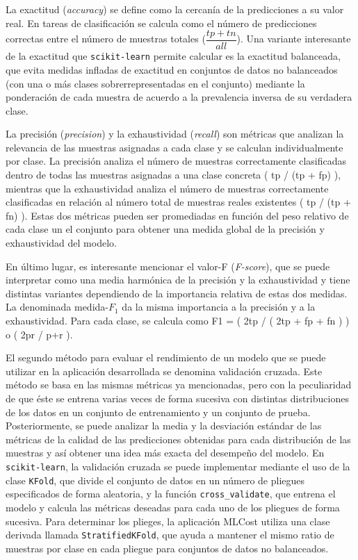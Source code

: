 La exactitud (\emph{accuracy}) se define como la cercanía de la predicciones a su valor real. En tareas de clasificación se calcula como el número de predicciones correctas entre el número de muestras totales ($\dfrac{tp+tn}{all}$). Una variante interesante de la exactitud que \texttt{scikit-learn} permite calcular es la exactitud balanceada, que evita medidas infladas de exactitud en conjuntos de datos no balanceados (con una o más clases sobrerrepresentadas en el conjunto) mediante la ponderación de cada muestra de acuerdo a la prevalencia inversa de su verdadera clase.

La precisión (\emph{precision}) y la exhaustividad (\emph{recall}) son métricas que analizan la relevancia de las muestras asignadas a cada clase y se calculan individualmente por clase. La precisión analiza el número de muestras correctamente clasificadas dentro de todas las muestras asignadas a una clase concreta ( tp / (tp + fp) ), mientras que la exhaustividad analiza el número de muestras correctamente clasificadas en relación al número total de muestras reales existentes ( tp / (tp + fn) ). Estas dos métricas pueden ser promediadas en función del peso relativo de cada clase un el conjunto para obtener una medida global de la precisión y exhaustividad del modelo.

En último lugar, es interesante mencionar el valor-F (\emph{F-score}), que se puede interpretar como una media harmónica de la precisión y la exhaustividad y tiene distintas variantes dependiendo de la importancia relativa de estas dos medidas. La denominada medida-$F_1$ da la misma importancia a la precisión y a la exhaustividad. Para cada clase, se calcula como F1 = ( 2tp / ( 2tp + fp + fn ) ) o ( 2pr / p+r ). 


El segundo método para evaluar el rendimiento de un modelo que se puede utilizar en la aplicación desarrollada se denomina validación cruzada. Este método se basa en las mismas métricas ya mencionadas, pero con la peculiaridad de que éste se entrena varias veces de forma sucesiva con distintas distribuciones de los datos en un conjunto de entrenamiento y un conjunto de prueba. Posteriormente, se puede analizar la media y la desviación estándar de las métricas de la calidad de las predicciones obtenidas para cada distribución de las muestras y así obtener una idea más exacta del desempeño del modelo. En \texttt{scikit-learn}, la validación cruzada se puede implementar mediante el uso de la clase \texttt{KFold}, que divide el conjunto de datos en un número de pliegues especificados de forma aleatoria, y la función \texttt{cross\_validate}, que entrena el modelo y calcula las métricas deseadas para cada uno de los pliegues de forma sucesiva. Para determinar los plieges, la aplicación MLCost utiliza una clase derivada llamada \texttt{StratifiedKFold}, que ayuda a mantener el mismo ratio de muestras por clase en cada pliegue para conjuntos de datos no balanceados.


